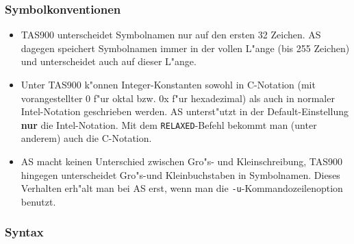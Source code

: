 \documentclass[12pt,a4paper,twoside]{report}
\newcommand{\bb}[1]{{\bf #1}}
\newcommand{\tty}[1]{{\tt #1}}
\newcommand{\asname}{AS}
\begin{document}
\subsubsection{Symbolkonventionen}

\begin{itemize}
\item{TAS900 unterscheidet Symbolnamen nur auf den ersten 32 Zeichen.
      \asname{} dagegen speichert Symbolnamen immer in der vollen L"ange (bis
      255 Zeichen) und unterscheidet auch auf dieser L"ange.}
\item{Unter TAS900 k"onnen Integer-Konstanten sowohl in C-Notation (mit
      vorangestellter 0 f"ur oktal bzw. 0x f"ur hexadezimal) als auch in
      normaler Intel-Notation geschrieben werden.  \asname{} unterst"utzt in der
      Default-Einstellung \bb{nur} die Intel-Notation.  Mit dem
      \tty{RELAXED}-Befehl bekommt man (unter anderem) auch die C-Notation.}
\item{\asname{} macht keinen Unterschied zwischen Gro"s- und Kleinschreibung,
      TAS900 hingegen unterscheidet Gro"s-und Kleinbuchstaben in
      Symbolnamen.  Dieses Verhalten erh"alt man bei \asname{} erst, wenn man
      die \tty{-u}-Kommandozeilenoption benutzt.}
\end{itemize}

\subsubsection{Syntax}
\end{document}

